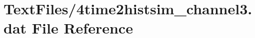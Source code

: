 \hypertarget{4time2histsim__channel3_8dat}{}\section{Text\+Files/4time2histsim\+\_\+channel3.dat File Reference}
\label{4time2histsim__channel3_8dat}

